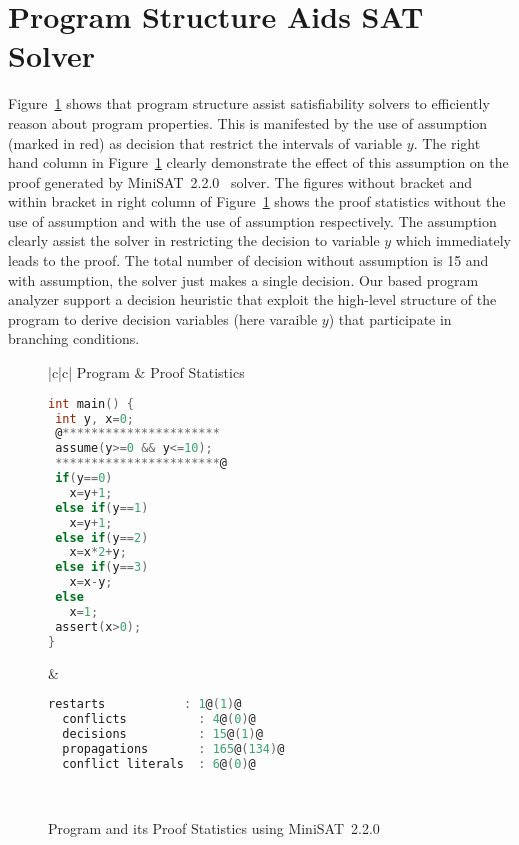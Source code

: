 \section{Program Structure Aids SAT Solver}
%
Figure~\ref{fig:sat-program} shows that program structure assist satisfiability 
solvers to efficiently reason about program properties.  This is manifested by
the use of assumption (marked in red) as decision that restrict the intervals 
of variable $y$.  The right hand column in Figure~\ref{fig:sat-program} clearly 
demonstrate the effect of this assumption on the proof generated by 
MiniSAT~2.2.0~\cite{minisat} solver.  The figures without bracket and within 
bracket in right column of Figure~\ref{fig:sat-program} shows the proof statistics 
without the use of assumption and with the use of assumption respectively. The
assumption clearly assist the solver in restricting the decision to variable $y$
which immediately leads to the proof.  The total number of decision without assumption 
is 15 and with assumption, the solver just makes a single decision.  Our  
based program analyzer support a decision heuristic that exploit the high-level structure 
of the program to derive decision variables (here varaible $y$) that participate in 
branching conditions. 
%
\begin{figure}[t]
\centering
\small
\begin{tabular}{|c|c|}
\hline
  Program & Proof Statistics \\
\hline
\scriptsize
\begin{lstlisting}[mathescape=true,language=C,style=base]
int main() {
 int y, x=0;
 @**********************
 assume(y>=0 && y<=10);
 ***********************@
 if(y==0)
   x=y+1;
 else if(y==1)
   x=y+1;
 else if(y==2)
   x=x*2+y;
 else if(y==3)
   x=x-y;
 else 
   x=1;
 assert(x>0);
}
\end{lstlisting}
&
\begin{lstlisting}[mathescape=true,language=C,style=base]
  restarts           : 1@(1)@
  conflicts          : 4@(0)@           
  decisions          : 15@(1)@
  propagations       : 165@(134)@         
  conflict literals  : 6@(0)@ 
\end{lstlisting}
\\
\hline
\end{tabular}
\caption{\label{fig:sat-program} Program and its Proof Statistics using
  MiniSAT~2.2.0}
\end{figure}
%
